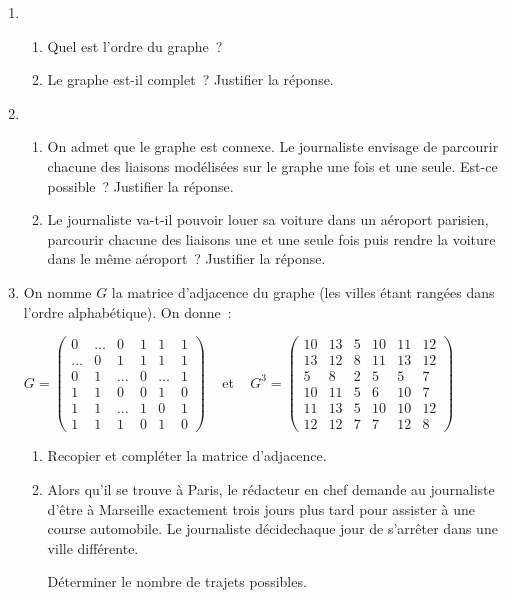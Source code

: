 \begin{enumerate}
     \item
     \begin{enumerate}[label=\alph*.]
          \item Quel est l'ordre du graphe~?
          \item Le graphe est-il complet~? Justifier la réponse.
     \end{enumerate}
     \item
     \begin{enumerate}[label=\alph*.]
          \item On admet que le graphe est connexe. Le journaliste envisage de parcourir chacune des
          liaisons modélisées sur le graphe une fois et une seule. Est-ce possible~? Justifier la réponse.
          \item Le journaliste va-t-il pouvoir louer sa voiture dans un aéroport parisien, parcourir chacune des liaisons une et une seule fois puis rendre la voiture dans le même aéroport~? Justifier la réponse.
     \end{enumerate}
     \item  On nomme $G$ la matrice d'adjacence du graphe (les villes étant rangées dans l'ordre
     alphabétique). On donne~:
     \par
     \begin{center}
          $G = \begin{pmatrix}
               0 &\ldots &0 &1 &1 &1 \\
               \ldots&0 &1 &1 &1 &1\\
               0 &1 &\ldots &0 &\ldots &1\\
               1 &1 &0 &0 &1 &0 \\
               1 &1 &\ldots &1 &0 &1\\
               1 &1 &1 &0 &1 &0
          \end{pmatrix} $
          ~  et ~ $G^3 = \begin{pmatrix}
               10 &13 &5 &10 &11 &12\\
               13 &12 &8 &11 &13 &12\\
               5 &8 &2 &5 &5 &7\\
               10 &11 &5 &6 &10 &7\\
               11 &13& 5 &10 &10 &12\\
               12 &12 &7 &7 &12 &8
          \end{pmatrix}$
     \end{center}
     \begin{enumerate}[label=\alph*.]
          \item Recopier et compléter la matrice d'adjacence.
          \item Alors qu'il se trouve à Paris, le rédacteur en chef demande au journaliste d'être à Marseille exactement trois jours plus tard pour assister à une course automobile. Le journaliste décidechaque jour de s'arrêter dans une ville différente.
          \par
          Déterminer le nombre de trajets possibles.
     \end{enumerate}
\end{enumerate}
